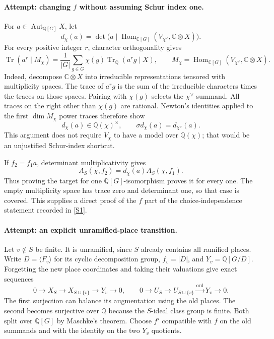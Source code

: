 \documentclass[11pt,a4paper]{article}
\newcommand{\Q}{\mathbb{Q}}
\newcommand{\C}{\mathbb{C}}
\newcommand{\sref}[2]{\hyperlink{source:#1:#2}{[S#2]}}
\numberwithin{equation}{section}
\begin{document}
\paragraph{Attempt: changing $f$ without assuming Schur index one.}
For $a\in\operatorname{Aut}_{\Q[G]}X$, let
\begin{equation}
 d_\chi(a)=\det\bigl(a\mid
 \operatorname{Hom}_{\C[G]}(V_{\chi^\vee},\C\otimes X)\bigr).
\end{equation}
For every positive integer $r$, character orthogonality gives
\begin{equation}\label{166:trace}
 \operatorname{Tr}(a^r\mid M_\chi)
 =\frac1{|G|}\sum_{g\in G}\chi(g)
   \operatorname{Tr}_{\Q}(a^r g\mid X),\qquad
 M_\chi=\operatorname{Hom}_{\C[G]}(V_{\chi^\vee},\C\otimes X).
\end{equation}
Indeed, decompose $\C\otimes X$ into irreducible representations tensored
with multiplicity spaces. The trace of $a^rg$ is the sum of the
irreducible characters times the traces on those spaces. Pairing with
$\chi(g)$ selects the $\chi^\vee$ summand. All traces on the right other
than $\chi(g)$ are rational. Newton's identities applied to the first
$\dim M_\chi$ power traces therefore show
\begin{equation}
 d_\chi(a)\in\Q(\chi)^\times,\qquad
 \sigma d_\chi(a)=d_{\chi^\sigma}(a).
\end{equation}
This argument does not require $V_\chi$ to have a model over $\Q(\chi)$;
that would be an unjustified Schur-index shortcut.

If $f_2=f_1a$, determinant multiplicativity gives
\begin{equation}
 A_S(\chi,f_2)=d_\chi(a)A_S(\chi,f_1).
\end{equation}
Thus proving the target for one $\Q[G]$-isomorphism proves it for every
one. The empty multiplicity space has trace zero and determinant one,
so that case is covered. This supplies a direct proof of the $f$ part
of the choice-independence statement recorded in \sref{166}{1}.

\paragraph{Attempt: an explicit unramified-place transition.}
Let $v\notin S$ be finite. It is unramified, since $S$ already contains
all ramified places. Write $D=\langle F_v\rangle$ for its cyclic
decomposition group, $f_v=|D|$, and $Y_v=\Q[G/D]$. Forgetting the new
place coordinates and taking their valuations give exact sequences
\begin{equation}
 0\to X_S\to X_{S\cup\{v\}}\to Y_v\to0,
 \qquad
 0\to U_S\to U_{S\cup\{v\}}\xrightarrow{\operatorname{ord}}Y_v\to0.
\end{equation}
The first surjection can balance its augmentation using the old places.
The second becomes surjective over $\Q$ because the $S$-ideal class
group is finite. Both split over $\Q[G]$ by Maschke's theorem. Choose
$f'$ compatible with $f$ on the old summands and with the identity on
the two $Y_v$ quotients.
\end{document}
